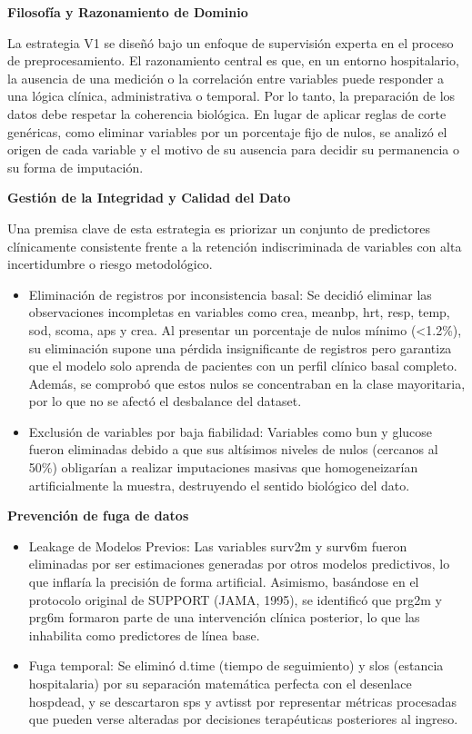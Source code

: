 \textbf{Filosofía y Razonamiento de Dominio}

La estrategia V1 se diseñó bajo un enfoque de supervisión experta en el proceso
de preprocesamiento. El razonamiento central es que, en un entorno hospitalario,
la ausencia de una medición o la correlación entre variables puede responder a
una lógica clínica, administrativa o temporal. Por lo tanto, la preparación de
los datos debe respetar la coherencia biológica. En lugar de aplicar reglas de
corte genéricas, como eliminar variables por un porcentaje fijo de nulos, se
analizó el origen de cada variable y el motivo de su ausencia para decidir su
permanencia o su forma de imputación.

\textbf{Gestión de la Integridad y Calidad del Dato}

Una premisa clave de esta estrategia es priorizar un conjunto de predictores
clínicamente consistente frente a la retención indiscriminada de variables con
alta incertidumbre o riesgo metodológico.

\begin{itemize}
  \item Eliminación de registros por inconsistencia basal: Se decidió eliminar las
    observaciones incompletas en variables como crea, meanbp, hrt, resp, temp,
    sod, scoma, aps y crea. Al presentar un porcentaje de nulos mínimo (<1.2\%),
    su eliminación supone una pérdida insignificante de registros pero garantiza
    que el modelo solo aprenda de pacientes con un perfil clínico basal
    completo. Además, se comprobó que estos nulos se concentraban en la clase
    mayoritaria, por lo que no se afectó el desbalance del dataset.
  \item Exclusión de variables por baja fiabilidad: Variables como bun y glucose
    fueron eliminadas debido a que sus altísimos niveles de nulos (cercanos
    al 50\%) obligarían a realizar imputaciones masivas que homogeneizarían
    artificialmente la muestra, destruyendo el sentido biológico del dato.
\end{itemize}

\textbf{Prevención de fuga de datos}

\begin{itemize}
  \item Leakage de Modelos Previos: Las variables surv2m y surv6m fueron eliminadas
    por ser estimaciones generadas por otros modelos predictivos, lo que
    inflaría la precisión de forma artificial. Asimismo, basándose en el
    protocolo original de SUPPORT (JAMA, 1995), se identificó que prg2m y prg6m
    formaron parte de una intervención clínica posterior, lo que las inhabilita
    como predictores de línea base.
  \item Fuga temporal: Se eliminó d.time (tiempo de seguimiento) y slos (estancia hospitalaria) por su
    separación matemática perfecta con el desenlace hospdead, y se descartaron
    sps y avtisst por representar métricas procesadas que pueden verse alteradas
    por decisiones terapéuticas posteriores al ingreso.
\end{itemize}

